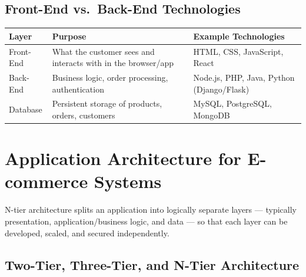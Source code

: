 \documentclass[11pt,a4paper]{article}
\begin{document}
\subsection{Front-End vs.\ Back-End Technologies}
\begin{center}
\begin{tabular}{@{}p{2.4cm}p{5.0cm}p{5.2cm}@{}}
\toprule
\rowcolor{primary!15}
\textbf{Layer} & \textbf{Purpose} & \textbf{Example Technologies} \\
\midrule
Front-End & What the customer sees and interacts with in the browser/app & HTML, CSS, JavaScript, React \\
Back-End & Business logic, order processing, authentication & Node.js, PHP, Java, Python (Django/Flask) \\
Database & Persistent storage of products, orders, customers & MySQL, PostgreSQL, MongoDB \\
\bottomrule
\end{tabular}
\end{center}

\section{Application Architecture for E-commerce Systems}

\begin{definitionbox}
N-tier architecture splits an application into logically separate layers --- typically presentation, application/business logic, and data --- so that each layer can be developed, scaled, and secured independently.
\end{definitionbox}

\subsection{Two-Tier, Three-Tier, and N-Tier Architecture}

\begin{center}
\end{center}
\end{document}
